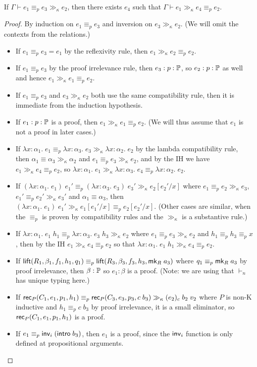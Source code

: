 \begin{lemma}\label{thm:gg_compat}
If $\Gamma\vdash e_1\equiv_p e_3\gg_\kappa e_2$, then there exists $e_4$ such that $\Gamma\vdash e_1\gg_\kappa e_4\equiv_p e_2$.
\end{lemma}
\begin{proof}
By induction on $e_1\equiv_p e_3$ and inversion on $e_3\gg_\kappa e_2$. (We will omit the contexts from the relations.)
\begin{itemize}
\item If $e_1\equiv_p e_3=e_1$ by the reflexivity rule, then $e_1\gg_\kappa e_2\equiv_p e_2$.
\item If $e_1\equiv_p e_3$ by the proof irrelevance rule, then $e_3:p:\P$, so $e_2:p:\P$ as well and hence $e_1\gg_\kappa e_1\equiv_p e_2$.
\item If $e_1\equiv_p e_3$ and $e_3\gg_\kappa e_2$ both use the same compatibility rule, then it is immediate from the induction hypothesis.
\item If $e_1:p:\P$ is a proof, then $e_1\gg_\kappa e_1\equiv_p e_2$. (We will thus assume that $e_1$ is not a proof in later cases.)
\item If $\lambda x:\alpha_1.\;e_1\equiv_p\lambda x:\alpha_3.\;e_3\gg_\kappa\lambda x:\alpha_2.\;e_2$ by the lambda compatibility rule, then $\alpha_1\equiv\alpha_3\gg_\kappa\alpha_2$ and $e_1\equiv_p e_3\gg_\kappa e_2$, and by the IH we have $e_1\gg_\kappa e_4\equiv_p e_2$, so $\lambda x:\alpha_1.\;e_1\gg_\kappa\lambda x:\alpha_3.\;e_4\equiv_p\lambda x:\alpha_2.\;e_2$.
\item If $(\lambda x:\alpha_1.\;e_1)\;e_1'\equiv_p(\lambda x:\alpha_3.\;e_3)\;e_3'\gg_\kappa e_2[e_2'/x]$ where $e_1\equiv_p e_2\gg_\kappa e_3$, $e_1'\equiv_p e_2'\gg_\kappa e_3'$ and $\alpha_1\equiv\alpha_3$, then $(\lambda x:\alpha_1.\;e_1)\;e_1'\gg_\kappa e_1[e_1'/x]\equiv_p e_2[e_2'/x]$. (Other cases are similar, when the $\equiv_p$ is proven by compatibility rules and the $\gg_\kappa$ is a substantive rule.)
\item If $\lambda x:\alpha_1.\;e_1\;h_1\equiv_p\lambda x:\alpha_3.\;e_3\;h_3\gg_\kappa e_2$ where $e_1\equiv_p e_3\gg_\kappa e_2$ and $h_1\equiv_p h_3\equiv_p x$, then by the IH $e_1\gg_\kappa e_4\equiv_p e_2$ so that $\lambda x:\alpha_1.\;e_1\;h_1\gg_\kappa e_4\equiv_p e_2$.
\item If $\lift(R_1,\beta_1,f_1,h_1,q_1)\equiv_p\lift(R_3,\beta_3,f_3,h_3,\mk_R\;a_3)$ where $q_1\equiv_p \mk_R\;a_3$ by proof irrelevance, then $\beta:\P$ so $e_1:\beta$ is a proof. (Note: we are using that $\vdash_n$ has unique typing here.)
\item If $\rec_P(C_1,e_1,p_1,h_1)\equiv_p\rec_P(C_3,e_3,p_3,c\;b_3)\gg_\kappa (e_2)_c\;b_2\;v_2$ where $P$ is non-K inductive and $h_1\equiv_p c\;b_3$ by proof irrelevance, it is a small eliminator, so $\rec_P(C_1,e_1,p_1,h_1)$ is a proof.
\item If $e_1\equiv_p\inv_i\;(\intro\;b_3)$, then $e_1$ is a proof, since the $\inv_i$ function is only defined at propositional arguments.
\end{itemize}
\end{proof}
